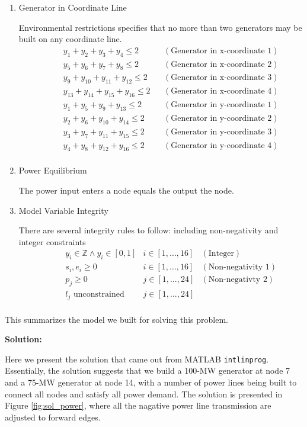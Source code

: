 \begin{enumerate}
\item Generator in Coordinate Line \par
Environmental restrictions specifies that no more than two generators may be built on any coordinate line.
\begin{align*}
&&& y_1 + y_2 + y_3 + y_4 \leq 2 && (\text{Generator in x-coordinate 1}) \\
&&& y_5 + y_6 + y_7 + y_8 \leq 2 && (\text{Generator in x-coordinate 2}) \\
&&& y_9 + y_{10} + y_{11} + y_{12} \leq 2 && (\text{Generator in x-coordinate 3}) \\
&&& y_{13} + y_{14} + y_{15} + y_{16} \leq 2 && (\text{Generator in x-coordinate 4}) \\
&&& y_1 + y_5 + y_9 + y_{13} \leq 2 && (\text{Generator in y-coordinate 1}) \\
&&& y_2 + y_6 + y_{10} + y_{14} \leq 2 && (\text{Generator in y-coordinate 2}) \\
&&& y_3 + y_{7} + y_{11} + y_{15} \leq 2 && (\text{Generator in y-coordinate 3}) \\
&&& y_{4} + y_{8} + y_{12} + y_{16} \leq 2 && (\text{Generator in y-coordinate 4}) \\
\end{align*}

\item Power Equilibrium \par
The power input enters a node equals the output the node.

\item Model Variable Integrity \par
There are several integrity rules to follow: including non-negativity and integer constraints
\begin{align*}
&&& y_i \in \mathbb{Z} \land y_i \in [0, 1] & i \in [1,...,16] & (\text{Integer}) \\
&&& s_i, e_i \geq 0 & i \in [1,...,16] & (\text{Non-negativity 1}) \\
&&& p_j \geq 0 & j \in [1,...,24] & (\text{Non-negativty 2}) \\
&&& l_j \text{ unconstrained} &  j \in [1,...,24] & \\
\end{align*}
\end{enumerate}
This summarizes the model we built for solving this problem.


\textbf{Solution:}\par

Here we present the solution that came out from MATLAB \texttt{intlinprog}. Essentially, the solution suggests that we build a 100-MW generator at node 7 and a 75-MW generator at node 14, with a number of power lines being built to connect all nodes and satisfy all power demand. The solution is presented in Figure \ref{fig:sol_power}, where all the nagative power line transmission are adjusted to forward edges. 

